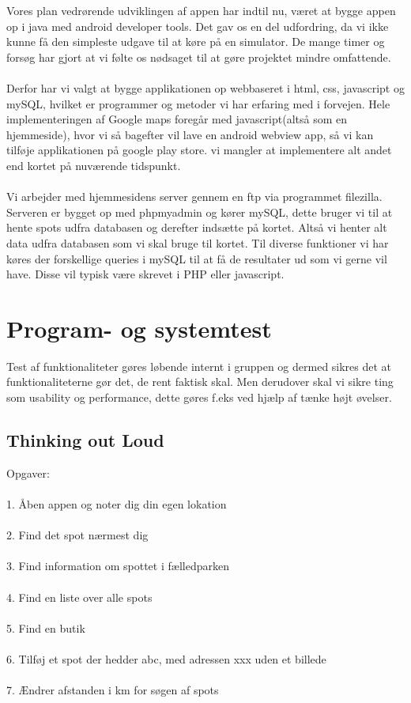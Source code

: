 \documentclass[12pt]{article}
\begin{document}
Vores plan vedrørende udviklingen af appen har indtil nu, været at bygge appen op i java med android developer tools. Det gav os en del udfordring, da vi ikke kunne få den simpleste udgave til at køre på en simulator. De mange timer og forsøg har gjort at vi følte os nødsaget til at gøre projektet mindre omfattende. 
\\\\
Derfor har vi valgt at bygge applikationen op webbaseret i html, css, javascript og mySQL, hvilket er programmer og metoder vi har erfaring med i forvejen. 
Hele implementeringen af Google maps foregår med javascript(altså som en hjemmeside), hvor vi så bagefter vil lave en android webview app, så vi kan tilføje applikationen på google play store. vi mangler at implementere alt andet end kortet på nuværende tidspunkt.\\\\
Vi arbejder med hjemmesidens server gennem en ftp via programmet filezilla. Serveren er bygget op med phpmyadmin og kører mySQL, dette bruger vi til at hente spots udfra databasen og derefter indsætte på kortet. Altså vi henter alt data udfra databasen som vi skal bruge til kortet. Til diverse funktioner vi har køres der forskellige queries i mySQL til at få de resultater ud som vi gerne vil have. Disse vil typisk være skrevet i PHP eller javascript.

\pagebreak

\section{Program- og systemtest}

Test af funktionaliteter gøres løbende internt i gruppen og dermed sikres det at funktionaliteterne gør det, de rent faktisk skal. Men derudover skal vi sikre ting som usability og performance, dette gøres f.eks ved hjælp af tænke højt øvelser.
\subsection*{Thinking out Loud}
Opgaver:\\\\
1. Åben appen og noter dig din egen lokation\\\\
2. Find det spot nærmest dig\\\\
3. Find information om spottet i fælledparken\\\\
4. Find en liste over alle spots\\\\
5. Find en butik\\\\
6. Tilføj et spot der hedder abc, med adressen xxx uden et billede\\\\
7. Ændrer afstanden i km for søgen af spots
\pagebreak
\end{document}

